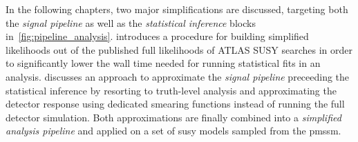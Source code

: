 In the following chapters, two major simplifications are discussed, targeting both the \textit{signal pipeline} as well as the \textit{statistical inference} blocks in~\cref{fig:pipeline_analysis}.  introduces a procedure for building simplified likelihoods out of the published full likelihoods of ATLAS SUSY searches in order to significantly lower the wall time needed for running statistical fits in an analysis.  discusses an approach to approximate the \textit{signal pipeline} preceeding the statistical inference by resorting to truth-level analysis and approximating the detector response using dedicated smearing functions instead of running the full detector simulation. Both approximations are finally combined into a \textit{simplified analysis pipeline} and applied on a set of \gls{susy} models sampled from the \gls{pmssm}. 


